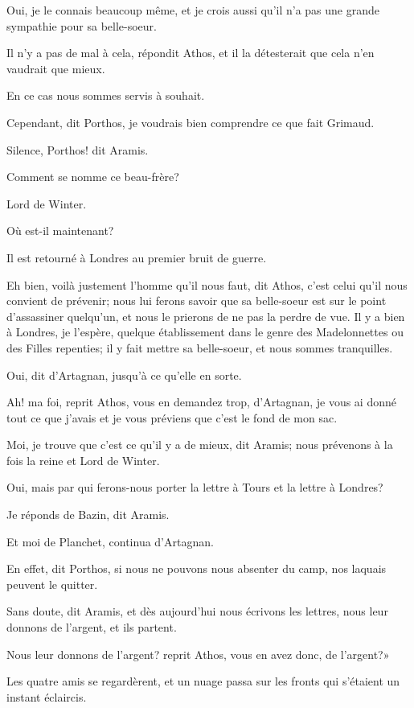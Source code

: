\speak  Oui, je le connais beaucoup même, et je crois aussi qu'il n'a pas une grande sympathie pour sa belle-soeur. 

\speak  Il n'y a pas de mal à cela, répondit Athos, et il la détesterait que cela n'en vaudrait que mieux. 

\speak  En ce cas nous sommes servis à souhait. 

\speak  Cependant, dit Porthos, je voudrais bien comprendre ce que fait Grimaud. 

\speak  Silence, Porthos! dit Aramis. 

\speak  Comment se nomme ce beau-frère? 

\speak  Lord de Winter. 

\speak  Où est-il maintenant? 

\speak  Il est retourné à Londres au premier bruit de guerre. 

\speak  Eh bien, voilà justement l'homme qu'il nous faut, dit Athos, c'est celui qu'il nous convient de prévenir; nous lui ferons savoir que sa belle-soeur est sur le point d'assassiner quelqu'un, et nous le prierons de ne pas la perdre de vue. Il y a bien à Londres, je l'espère, quelque établissement dans le genre des Madelonnettes ou des Filles repenties; il y fait mettre sa belle-soeur, et nous sommes tranquilles. 

\speak  Oui, dit d'Artagnan, jusqu'à ce qu'elle en sorte. 

\speak  Ah! ma foi, reprit Athos, vous en demandez trop, d'Artagnan, je vous ai donné tout ce que j'avais et je vous préviens que c'est le fond de mon sac. 

\speak  Moi, je trouve que c'est ce qu'il y a de mieux, dit Aramis; nous prévenons à la fois la reine et Lord de Winter. 

\speak  Oui, mais par qui ferons-nous porter la lettre à Tours et la lettre à Londres? 

\speak  Je réponds de Bazin, dit Aramis. 

\speak  Et moi de Planchet, continua d'Artagnan. 

\speak  En effet, dit Porthos, si nous ne pouvons nous absenter du camp, nos laquais peuvent le quitter. 

\speak  Sans doute, dit Aramis, et dès aujourd'hui nous écrivons les lettres, nous leur donnons de l'argent, et ils partent. 

\speak  Nous leur donnons de l'argent? reprit Athos, vous en avez donc, de l'argent?» 

Les quatre amis se regardèrent, et un nuage passa sur les fronts qui s'étaient un instant éclaircis. 

